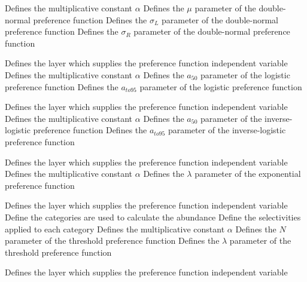  {Defines the multiplicative constant $\alpha$}
 {Defines the $\mu$ parameter of the double-normal preference function}
 {Defines the $\sigma_L$ parameter of the double-normal preference function}
 {Defines the $\sigma_R$ parameter of the double-normal preference function}
\par\textbf{}\par
{} {Defines the layer which supplies the preference function independent variable}
 {Defines the multiplicative constant $\alpha$}
 {Defines the $a_{50}$ parameter of the logistic preference function}
 {Defines the $a_{to95}$ parameter of the logistic preference function}
\par\textbf{}\par
{} {Defines the layer which supplies the preference function independent variable}
 {Defines the multiplicative constant $\alpha$}
 {Defines the $a_{50}$ parameter of the inverse-logistic preference function}
 {Defines the $a_{to95}$ parameter of the inverse-logistic preference function}
\par\textbf{}\par
{} {Defines the layer which supplies the preference function independent variable}
 {Defines the multiplicative constant $\alpha$}
 {Defines the $\lambda$ parameter of the exponential preference function}
\par\textbf{}\par
{} {Defines the layer which supplies the preference function independent variable}
 {Define the categories are used to calculate the abundance}
 {Define the selectivities applied to each category}
 {Defines the multiplicative constant $\alpha$}
 {Defines the $N$ parameter of the threshold preference function}
 {Defines the $\lambda$ parameter of the threshold preference function}
\par\textbf{}\par
{} {Defines the layer which supplies the preference function independent variable}
